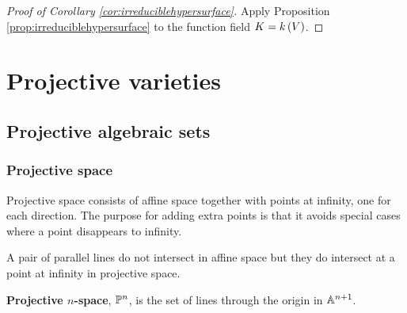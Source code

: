 \begin{proof}[Proof of Corollary \ref{cor:irreduciblehypersurface}]
Apply Proposition \ref{prop:irreduciblehypersurface} to the function field $ K = k\br{V} $.
\end{proof}

\pagebreak

\section{Projective varieties}

\subsection{Projective algebraic sets}

\subsubsection{Projective space}


Projective space consists of affine space together with points at infinity, one for each direction. The purpose for adding extra points is that it avoids special cases where a point disappears to infinity.

\begin{example*}
A pair of parallel lines do not intersect in affine space but they do intersect at a point at infinity in projective space.
\end{example*}

\begin{definition*}
\textbf{Projective $ n $-space}, $ \PP^n $, is the set of lines through the origin in $ \AA^{n + 1} $.
\end{definition*}


